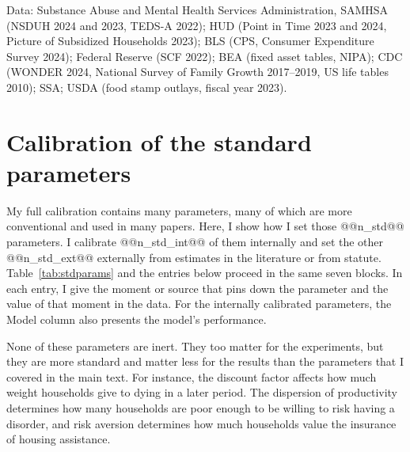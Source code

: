\documentclass[10pt]{article}
\begin{document}
{\noindent Data: Substance Abuse and Mental Health Services Administration, SAMHSA (NSDUH 2024 and 2023, TEDS-A 2022); HUD (Point in Time 2023 and 2024, Picture of Subsidized Households 2023); BLS (CPS, Consumer Expenditure Survey 2024); Federal Reserve (SCF 2022); BEA (fixed asset tables, NIPA); CDC (WONDER 2024, National Survey of Family Growth 2017--2019, US life tables 2010); SSA; USDA (food stamp outlays, fiscal year 2023).\par}

\clearpage
\appendix

\setcounter{table}{0}
\section[Calibration of the standard parameters]{Calibration of the standard parameters}\label{sec:stdparams}

  My full calibration contains many parameters, many of which are more conventional and used in many papers. Here, I show how I set those @@n_std@@ parameters. I calibrate @@n_std_int@@ of them internally and set the other @@n_std_ext@@ externally from estimates in the literature or from statute. Table~\ref{tab:stdparams} and the entries below proceed in the same seven blocks. In each entry, I give the moment or source that pins down the parameter and the value of that moment in the data. For the internally calibrated parameters, the Model column also presents the model's performance.

 None of these parameters are inert. They too matter for the experiments, but they are more standard and matter less for the results than the parameters that I covered in the main text. For instance, the discount factor affects how much weight households give to dying in a later period. The dispersion of productivity determines how many households are poor enough to be willing to risk having a disorder, and risk aversion determines how much households value the insurance of housing assistance.


\end{document}
